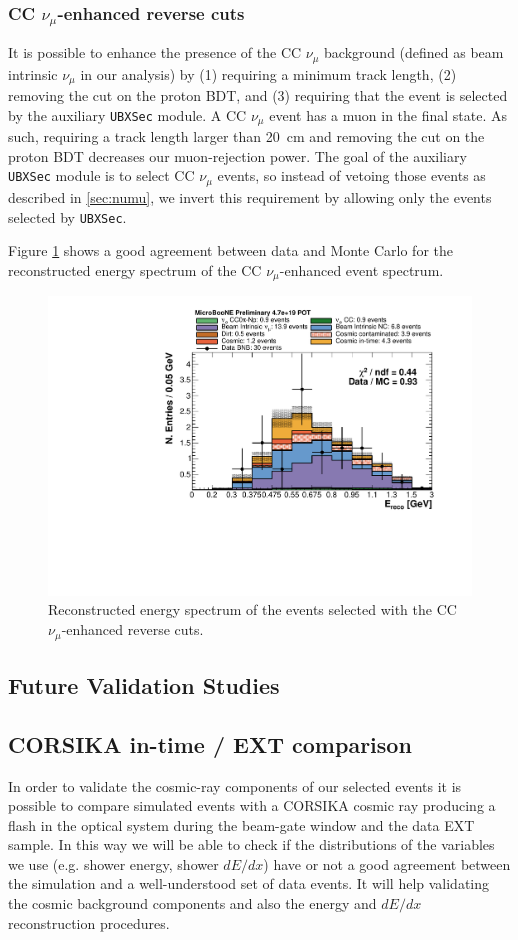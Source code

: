 \subsubsection{CC \texorpdfstring{$\nu_{\mu}$}{numu}-enhanced reverse cuts}
It is possible to enhance the presence of the CC $\nu_{\mu}$ background (defined as beam intrinsic $\nu_{\mu}$ in our analysis) by (1) requiring a minimum track length, (2) removing the cut on the proton BDT, and (3) requiring that the event is selected by the auxiliary \texttt{UBXSec} module. 
A CC $\nu_{\mu}$ event has a muon in the final state. As such, requiring a track length larger than 20~cm and removing the cut on the proton BDT decreases our muon-rejection power. The goal of the auxiliary \texttt{UBXSec} module is to select CC $\nu_{\mu}$ events, so instead of vetoing those events as described in \ref{sec:numu}, we invert this requirement by allowing only the events selected by \texttt{UBXSec}.

Figure \ref{fig:numu_inverted} shows a good agreement between data and Monte Carlo for the reconstructed energy spectrum of the CC $\nu_{\mu}$-enhanced event spectrum.

\begin{figure}[htbp]
\centering
  \includegraphics[width=0.65\linewidth]{figures/numu_reco.pdf}
  \caption{Reconstructed energy spectrum of the events selected with the CC $\nu_{\mu}$-enhanced reverse cuts.}\label{fig:numu_inverted}
\end{figure}

\subsection{Future Validation Studies}

\subsection{CORSIKA in-time / EXT comparison}
In order to validate the cosmic-ray components of our selected events it is possible to compare simulated events with a CORSIKA cosmic ray producing a flash in the optical system during the beam-gate window and the data EXT sample. 
In this way we will be able to check if the distributions of the variables we use (e.g. shower energy, shower $dE/dx$) have or not a good agreement between the simulation and a well-understood set of data events. 
It will help validating the cosmic background components and also the energy and $dE/dx$ reconstruction procedures.


